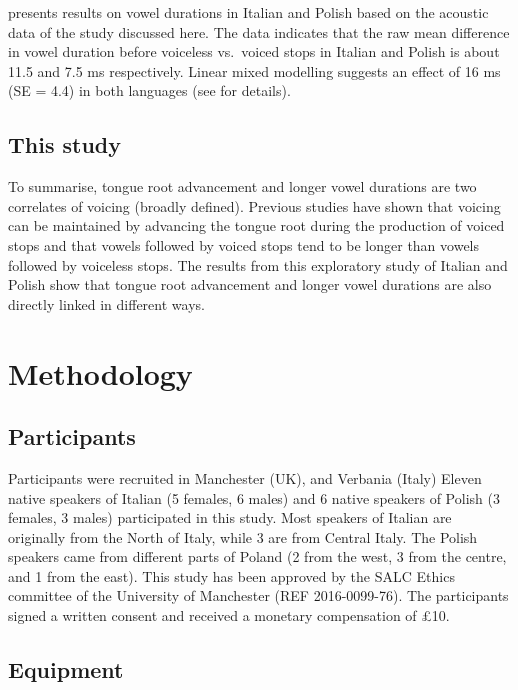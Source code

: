 \documentclass[12pt,]{article}
\begin{document}
\citet{coretta2018j} presents results on vowel durations in Italian and
Polish based on the acoustic data of the study discussed here. The data
indicates that the raw mean difference in vowel duration before
voiceless vs.~voiced stops in Italian and Polish is about 11.5 and 7.5
ms respectively. Linear mixed modelling suggests an effect of 16 ms (SE
= 4.4) in both languages (see \citealt{coretta2018j} for details).

\hypertarget{this-study}{%
\subsection{This study}\label{this-study}}

To summarise, tongue root advancement and longer vowel durations are two
correlates of voicing (broadly defined). Previous studies have shown
that voicing can be maintained by advancing the tongue root during the
production of voiced stops and that vowels followed by voiced stops tend
to be longer than vowels followed by voiceless stops. The results from
this exploratory study of Italian and Polish show that tongue root
advancement and longer vowel durations are also directly linked in
different ways.

\hypertarget{methodology}{%
\section{Methodology}\label{methodology}}

\hypertarget{participants}{%
\subsection{Participants}\label{participants}}

Participants were recruited in Manchester (UK), and Verbania (Italy)
Eleven native speakers of Italian (5 females, 6 males) and 6 native
speakers of Polish (3 females, 3 males) participated in this study. Most
speakers of Italian are originally from the North of Italy, while 3 are
from Central Italy. The Polish speakers came from different parts of
Poland (2 from the west, 3 from the centre, and 1 from the east). This
study has been approved by the SALC Ethics committee of the University
of Manchester (REF 2016-0099-76). The participants signed a written
consent and received a monetary compensation of £10.

\hypertarget{equipment}{%
\subsection{Equipment}\label{equipment}}
\end{document}
